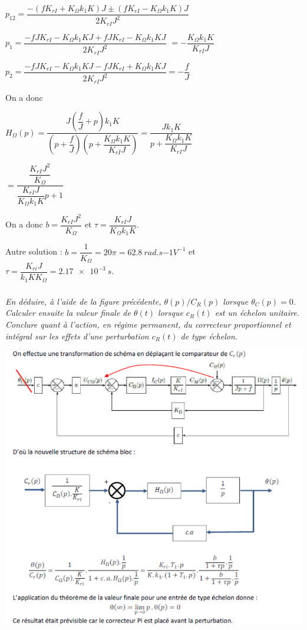 \documentclass[10pt,fleqn]{article} %
\begin{document}
\begin{multicols}{2}
\begin{corrige}
$p_{12} = \dfrac{-\left(f K_{rI}+K_{\Omega}k_{1}K\right)J \pm \left(f K_{rI}-K_{\Omega}k_{1}K\right)J}{2 K_{rI}J^2}$

$p_{1} = \dfrac{-fJ K_{rI}-K_{\Omega}k_{1}KJ + fJ K_{rI}-K_{\Omega}k_{1}KJ}{2 K_{rI}J^2}$
$= -\dfrac{K_{\Omega}k_{1}K }{ K_{rI}J}$


$p_{2} = \dfrac{-fJ K_{rI}-K_{\Omega}k_{1}KJ -fJ K_{rI}+K_{\Omega}k_{1}KJ}{2 K_{rI}J^2}= -\dfrac{f }{J}$

On a donc 

$H_{\Omega}(p)=\dfrac{J\left( \dfrac{f}{J} + p \right)k_{1}K}{\left(p+\dfrac{f }{J} \right)\left(p+\dfrac{K_{\Omega}k_{1}K }{ K_{rI}J} \right)}=\dfrac{Jk_{1}K}{p+\dfrac{K_{\Omega}k_{1}K }{ K_{rI}J} }$

$=\dfrac{\dfrac{ K_{rI}J^2}{K_{\Omega} } }{\dfrac{ K_{rI}J}{K_{\Omega}k_{1}K }p+1 }$

On a donc $b=\dfrac{ K_{rI}J^2}{K_{\Omega} }$ et $\tau =\dfrac{ K_{rI}J}{K_{\Omega}k_{1}K }$.

\normalsize
Autre solution : $b=\dfrac{1}{K_{\Omega}} = 20 \pi = \SI{62,8}{rad.s{-1}V^{-1}}$ et $\tau=\dfrac{K_{ri}J}{k_1KK_{\Omega}}=\SI{2,17e-3}{s}$.


\end{corrige}
\else
\fi

\subparagraph{}\textit{En déduire, à l'aide de la figure précédente, $\theta(p)/C_R(p)$
  lorsque $\theta_C(p)=0$. Calculer ensuite la valeur finale
  de $\theta(t)$ lorsque $c_R(t)$ est un échelon unitaire. %
  Conclure quant à l'action, en régime permanent, du correcteur
  proportionnel et intégral sur les effets d'une perturbation
  $c_R(t)$ de type échelon.}

\ifprof
\begin{corrige}
\begin{center}
\includegraphics[width=\linewidth]{images/cor_01.png}
\end{center}
\end{corrige}
\else
\fi


\end{multicols}
\end{document}
